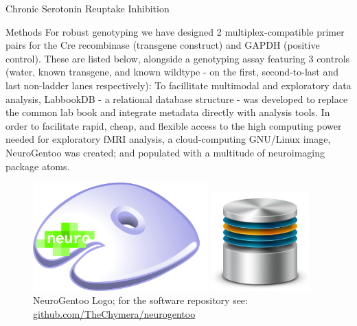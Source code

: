\documentclass{beamer}
\begin{document}
\begin{frame}
\begin{tudcolumn}{.48\textwidth}
\begin{myblock}{Chronic Serotonin Reuptake Inhibition}
					\end{myblock}
	\end{tudcolumn}
	\begin{tudcolumn}{.48\textwidth}
					\begin{myblock}{Methods}
						For robust genotyping we have designed 2 multiplex-compatible
						primer pairs for the Cre recombinase (transgene construct) and
						GAPDH (positive control).
						These are listed below, alongside a genotyping assay featuring 3
						controls (water, known transgene, and known wildtype - on the
						first, second-to-last and last non-ladder lanes respectively):
						To facillitate multimodal and exploratory data analysis,
						LabbookDB - a relational database structure - was developed to
						replace the common lab book and integrate metadata directly with
						analysis tools.
						In order to facilitate rapid, cheap, and flexible access to the
						high computing power needed for exploratory fMRI analysis, a
						cloud-computing GNU/Linux image, NeuroGentoo was created;
						and populated with a multitude of neuroimaging package atoms.
						\vspace{0.5em}
						\begin{figure}
							\begin{minipage}{0.43\textwidth}
								\centering\includegraphics[width=0.6\textwidth]{img/ng_large.png}
								\caption{NeuroGentoo Logo; for the software repository see:
										\href{https://github.com/TheChymera/neurogentoo}{github.com/TheChymera/neurogentoo}}
							\end{minipage}
							\hspace{1em}
							\begin{minipage}{0.45\textwidth}
								\centering\includegraphics[width=0.34\textwidth]{img/db.png}

\end{minipage}
\end{figure}
\end{myblock}
\end{tudcolumn}
\end{frame}
\end{document}
